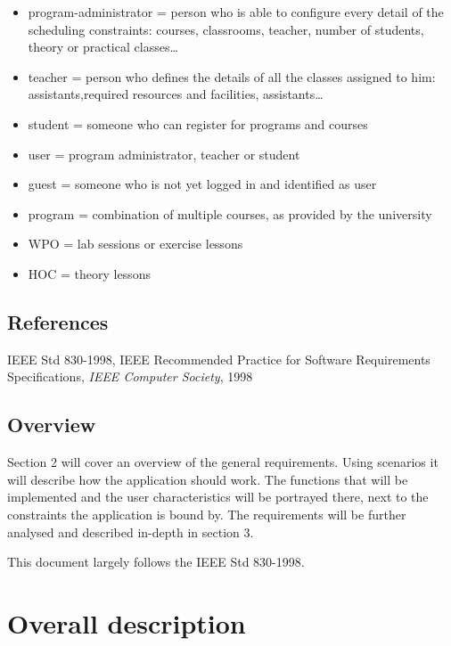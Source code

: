 \documentclass[9pt]{article}
\begin{document}
\begin{itemize}
\itemsep1pt\parskip0pt
\item
  program-administrator = person who is able to configure every detail
  of the scheduling constraints: courses, classrooms, teacher, number of
  students, theory or practical classes\ldots{}
\item
  teacher = person who defines the details of all the classes assigned
  to him: assistants,required resources and facilities,
  assistants\ldots{}
\item
  student = someone who can register for programs and courses
\item
  user = program administrator, teacher or student
\item
  guest = someone who is not yet logged in and identified as user
\item
  program = combination of multiple courses, as provided by the
  university
\item
  WPO = lab sessions or exercise lessons
\item
  HOC = theory lessons
\end{itemize}

\subsection{References}\label{references}

IEEE Std 830-1998, IEEE Recommended Practice for Software Requirements
Specifications, \emph{IEEE Computer Society}, 1998

\subsection{Overview}\label{overview}

Section 2 will cover an overview of the general requirements. Using
scenarios it will describe how the application should work. The
functions that will be implemented and the user characteristics will be
portrayed there, next to the constraints the application is bound by.
The requirements will be further analysed and described in-depth in
section 3.

This document largely follows the IEEE Std 830-1998.

\section{Overall description}\label{overall-description}
\end{document}
